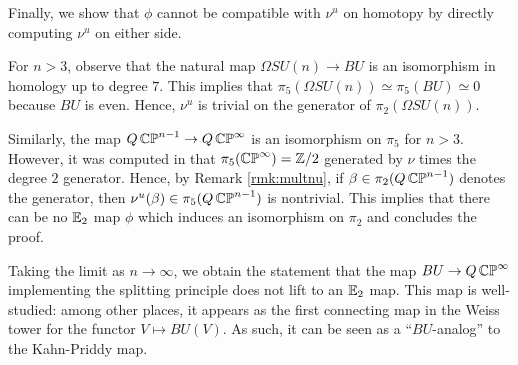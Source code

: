 Finally, we show that $\phi$ cannot be compatible with $\nu^u$ on homotopy by directly computing $\nu^u$ on either side.

For $n>3$, observe that the natural map $\Omega SU(n) \to BU$ is an isomorphism in homology up to degree $7$.  This implies that $\pi_5(\Omega SU(n)) \simeq \pi_5(BU) \simeq 0$ because $BU$ is even.  Hence, $\nu^u$ is trivial on the generator of $\pi_2(\Omega SU(n)).$  

Similarly, the map $Q\operatorname{\mathbb{CP}}^{n-1} \to Q\operatorname{\mathbb{CP}}^\infty$ is an isomorphism on $\pi_5$ for $n>3$.  However, it was computed in \cite[Theorem II.8]{Liulevicius} that $\pi_5(\operatorname{\mathbb{CP}}^{\infty})=\mathbb{Z}/2$ generated by $\nu$ times the degree $2$ generator.  Hence, by Remark \ref{rmk:multnu}, if $\beta\in \pi_2(Q\operatorname{\mathbb{CP}}^{n-1})$ denotes the generator, then $\nu^u(\beta)\in \pi_5(Q\operatorname{\mathbb{CP}}^{n-1})$ is nontrivial.  This implies that there can be no $\operatorname{\mathbb{E}}_2$ map $\phi$ which induces an isomorphism on $\pi_2$ and concludes the proof.  

\begin{rmk}%
Taking the limit as $n\to\infty$, we obtain the statement that the map $BU\to Q\operatorname{\mathbb{CP}}^{\infty}$ implementing the splitting principle does not lift to an $\operatorname{\mathbb{E}}_2$ map.  This map is well-studied: among other places, it appears as the first connecting map in the Weiss tower for the functor $V\mapsto BU(V)$.  As such, it can be seen as a ``$BU$-analog'' to the Kahn-Priddy map.  
\end{rmk}

